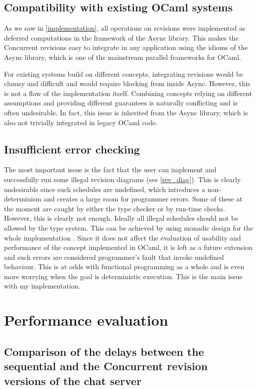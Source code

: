 \documentclass[12pt,twoside,notitlepage]{report}
\begin{document}
\subsection{Compatibility with existing OCaml systems}
As we saw in \ref{implementation}, all operations on revisions were implemented as deferred computations in the framework of the Async library. This makes the Concurrent revisions easy to integrate in any application using the idioms of the Async library, which is one of the mainstream parallel frameworks for OCaml.

For existing systems build on different concepts, integrating revisions would be clumsy and difficult and would require blocking from inside Async. However, this is not a flaw of the implementation itself. Combining concepts relying on different assumptions and providing different guarantees is naturally conflicting and is often undesirable. In fact, this issue is inherited from the Async library, which is also not trivially integrated in legacy OCaml code. 

\subsection{Insufficient error checking}
\label{problems}
The most important issue is the fact that the user can implement and successfully run some illegal revision diagrams (see \ref{rev_diag}). This is clearly undesirable since such schedules are undefined, which introduces a non-determinism and creates a large room for programmer errors. Some of these at the moment are caught by either the type checker or by run-time checks. However, this is clearly not enough. Ideally all illegal schedules should not be allowed by the type system. This can be achieved by using monadic design for the whole implementation \cite{haskell}. Since it does not affect the evaluation of usability and performance of the concept implemented in OCaml, it is left as a future extension and such errors are considered programmer's fault that invoke undefined behaviour. This is at odds with functional programming as a whole and is even more worrying when the goal is deterministic execution. This is the main issue with my implementation.


\section{Performance evaluation}
\label{perf_eval}
\subsection{Comparison of the delays between the sequential and the Concurrent revision versions of the chat server}
\end{document}
